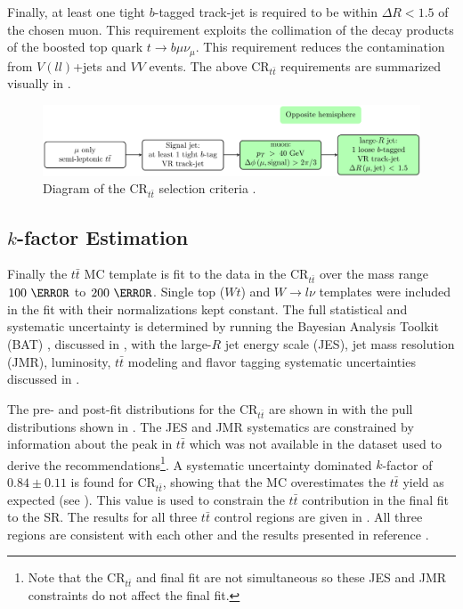 Finally, at least one tight $b$-tagged track-jet is required to be within
$\Delta R < 1.5$ of the chosen muon.  This requirement exploits the collimation
of the decay products of the boosted top quark $t \rightarrow
b\mu\nu_{\mu}$.  This requirement reduces the contamination from $V(ll)$+jets
and $VV$ events. The above $\text{CR}_{t\bar{t}}$ requirements are summarized visually in .

\begin{figure}[!htbp]
\centering
\includegraphics[width=1.0\linewidth]{figures/backgrounds/ttbar_selection}
\caption{Diagram of the $\text{CR}_{t\bar{t}}$ selection criteria \cite {Feickert:2690521}.}
\label{sec:background:ttbar_selection_diagram}
\end{figure}

\subsection{$k$-factor Estimation}

Finally the $t\bar{t}$ MC template is fit to the data in the
$\text{CR}_{t\bar{t}}$ over the mass range $100~\GeV$ to $200~\GeV$.  Single
top ($Wt$) and $W \rightarrow l\nu$ templates were included in the fit with
their normalizations kept constant. The full statistical and systematic
uncertainty is determined by running the Bayesian Analysis Toolkit (BAT)
\cite{Beaujean:2011zz}, discussed in , with the large-$R$ jet
energy scale (JES), jet mass resolution (JMR), luminosity, $t\bar{t}$
modeling and flavor tagging systematic uncertainties discussed in
.

The pre- and post-fit distributions for the $\text{CR}_{t\bar{t}}$ are shown in
 with the pull distributions shown in
.  The JES and JMR systematics are constrained
by information about the peak in $t\bar{t}$ which was not available in the
dataset used to derive the recommendations\footnote{Note that the
$\text{CR}_{t\bar{t}}$ and final fit are not simultaneous so these JES and JMR
constraints do not affect the final fit.}. A systematic uncertainty dominated
$k$-factor of $0.84 \pm 0.11$ is found for $\text{CR}_{t\bar{t}}$, showing that
the MC overestimates the $t\bar{t}$ yield as expected (see
). This value is used to constrain the
$t\bar{t}$ contribution in the final fit to the SR. The results for all three
$t\bar{t}$ control regions are given in .  All three
regions are consistent with each other and the results presented in reference
\cite{ATLAS:2016jct}.

